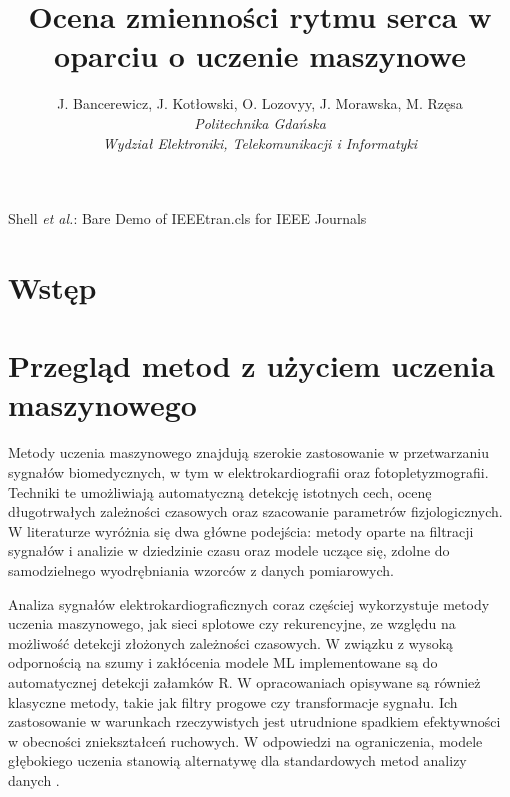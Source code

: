 \documentclass[journal]{IEEEtran}
\begin{document}
\title{Ocena zmienności rytmu serca w oparciu o uczenie maszynowe}
\author{
    J. Bancerewicz, J. Kotłowski, O. Lozovyy, J. Morawska, M. Rzęsa\\
    \textit{Politechnika Gdańska}\\
    \textit{Wydział Elektroniki, Telekomunikacji i Informatyki}
}


\markboth{}%
{Shell \MakeLowercase{\textit{et al.}}: Bare Demo of IEEEtran.cls for IEEE Journals}
\maketitle



\IEEEpeerreviewmaketitle



\section{Wstęp}


\newpage
\section{Przegląd metod z użyciem uczenia maszynowego}

Metody uczenia maszynowego znajdują szerokie zastosowanie w przetwarzaniu sygnałów biomedycznych, w tym w elektrokardiografii oraz fotopletyzmografii. Techniki te umożliwiają automatyczną detekcję istotnych cech, ocenę długotrwałych zależności czasowych oraz szacowanie parametrów fizjologicznych. W literaturze wyróżnia się dwa główne podejścia: metody oparte na filtracji sygnałów i analizie w dziedzinie czasu oraz modele uczące się, zdolne do samodzielnego wyodrębniania wzorców z danych pomiarowych.

Analiza sygnałów elektrokardiograficznych coraz częściej wykorzystuje metody uczenia maszynowego, jak sieci splotowe czy rekurencyjne, ze względu na możliwość detekcji złożonych zależności czasowych. W związku z wysoką odpornością na szumy i zakłócenia modele ML implementowane są do automatycznej detekcji załamków R. W opracowaniach opisywane są również klasyczne metody, takie jak filtry progowe czy transformacje sygnału. Ich zastosowanie w warunkach rzeczywistych jest utrudnione spadkiem efektywności w obecności zniekształceń ruchowych. W odpowiedzi na ograniczenia, modele głębokiego uczenia stanowią alternatywę dla standardowych metod analizy danych \cite{1}.
\end{document}
